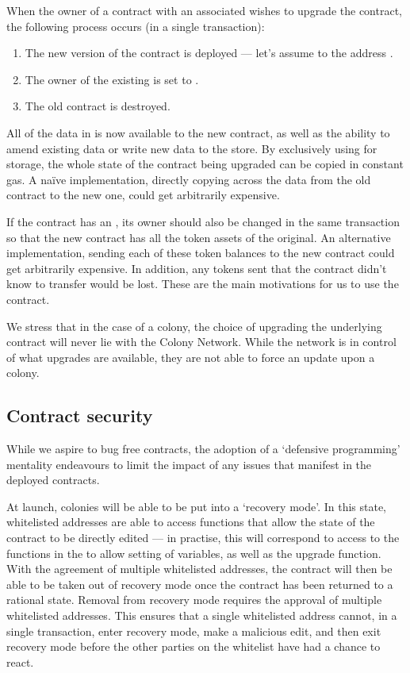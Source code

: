 When the owner of a contract with an associated  wishes to upgrade the contract, the following process occurs (in a single transaction):

\begin{enumerate}
\item The new version of the contract is deployed --- let's assume to the address .
\item The owner of the existing  is set to .
\item The old contract is destroyed.
\end{enumerate}

All of the data in  is now available to the new contract, as well as the ability to amend existing data or write new data to the store. By exclusively using  for storage, the whole state of the contract being upgraded can be copied in constant gas. A na{\"i}ve implementation, directly copying across the data from the old contract to the new one, could get arbitrarily expensive.

If the contract has an , its owner should also be changed in the same transaction so that the new contract has all the token assets of the original. An alternative implementation, sending each of these token balances to the new contract could get arbitrarily expensive. In addition, any tokens sent that the contract didn't know to transfer would be lost. These are the main motivations for us to use the  contract.

We stress that in the case of a colony, the choice of upgrading the underlying  contract will never lie with the Colony Network. While the network is in control of what upgrades are available, they are not able to force an update upon a colony.


\subsection{Contract security}\label{sec:escape-hatches}
While we aspire to bug free contracts, the adoption of a `defensive programming' mentality endeavours to limit the impact of any issues that manifest in the deployed contracts.

At launch, colonies will be able to be put into a `recovery mode'. In this state, whitelisted addresses are able to access functions that allow the state of the contract to be directly edited --- in practise, this will correspond to access to the functions in the  to allow setting of variables, as well as the upgrade function. With the agreement of multiple whitelisted addresses, the contract will then be able to be taken out of recovery mode once the contract has been returned to a rational state. Removal from recovery mode requires the approval of multiple whitelisted addresses. This ensures that a single whitelisted address cannot, in a single transaction, enter recovery mode, make a malicious edit, and then exit recovery mode before the other parties on the whitelist have had a chance to react.

